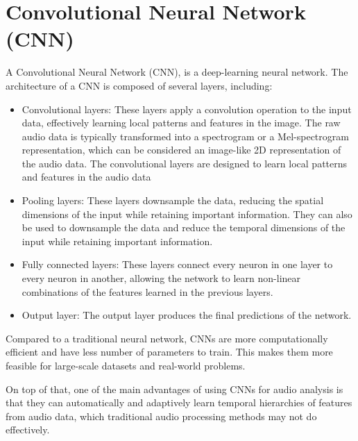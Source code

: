 




\section{Convolutional Neural Network (CNN)}

A Convolutional Neural Network (CNN), is a deep-learning neural network. The architecture of a CNN is composed of several layers, including:

\begin{itemize}

\item Convolutional layers: These layers apply a convolution operation to the input data, effectively learning local patterns and features in the image. The raw audio data is typically transformed into a spectrogram or a Mel-spectrogram representation, which can be considered an image-like 2D representation of the audio data. The convolutional layers are designed to learn local patterns and features in the audio data
\vspace*{3mm}

\item Pooling layers: These layers downsample the data, reducing the spatial dimensions of the input while retaining important information. They can also be used to downsample the data and reduce the temporal dimensions of the input while retaining important information. 
\vspace*{3mm}

\item Fully connected layers: These layers connect every neuron in one layer to every neuron in another, allowing the network to learn non-linear combinations of the features learned in the previous layers.
\vspace*{3mm}

\item Output layer: The output layer produces the final predictions of the network.
\end{itemize}

Compared to a traditional neural network, CNNs are more computationally efficient and have less number of parameters to train. This makes them more feasible for large-scale datasets and real-world problems.

On top of that, one of the main advantages of using CNNs for audio analysis is that they can automatically and adaptively learn temporal hierarchies of features from audio data, which traditional audio processing methods may not do effectively. 

